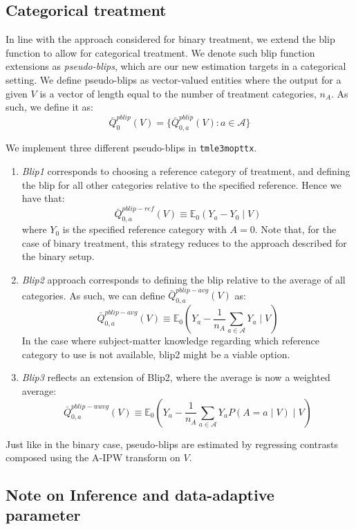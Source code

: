 \documentclass[12pt, krantz2,]{book}
\theoremstyle{definition}
\theoremstyle{definition}
\theoremstyle{definition}
\newcommand{\E}{\mathbb{E}}
\newcommand{\1}{\mathbbm{1}}
\begin{document}
\hypertarget{categorical-treatment}{%
\subsection{Categorical treatment}\label{categorical-treatment}}

In line with the approach considered for binary treatment, we extend the blip
function to allow for categorical treatment. We denote such blip function
extensions as \emph{pseudo-blips}, which are our new estimation targets in a
categorical setting. We define pseudo-blips as vector-valued entities where the
output for a given \(V\) is a vector of length equal to the number of treatment
categories, \(n_A\). As such, we define it as:
\[\bar{Q}_0^{pblip}(V) = \{\bar{Q}_{0,a}^{pblip}(V): a \in \mathcal{A} \}\]

We implement three different pseudo-blips in \texttt{tmle3mopttx}.

\begin{enumerate}
\def\labelenumi{\arabic{enumi}.}
\item
  \emph{Blip1} corresponds to choosing a reference category of treatment, and
  defining the blip for all other categories relative to the specified
  reference. Hence we have that:
  \[\bar{Q}_{0,a}^{pblip-ref}(V) \equiv \E_0(Y_a-Y_0 \mid V)\] where \(Y_0\) is
  the specified reference category with \(A=0\). Note that, for the case of
  binary treatment, this strategy reduces to the approach described for the
  binary setup.
\item
  \emph{Blip2} approach corresponds to defining the blip relative to the average of
  all categories. As such, we can define \(\bar{Q}_{0,a}^{pblip-avg}(V)\) as:
  \[\bar{Q}_{0,a}^{pblip-avg}(V) \equiv \E_0(Y_a - \frac{1}{n_A} \sum_{a \in
    \mathcal{A}} Y_a \mid V)\]
  In the case where subject-matter knowledge regarding which reference category
  to use is not available, blip2 might be a viable option.
\item
  \emph{Blip3} reflects an extension of Blip2, where the average is now a weighted
  average:
  \[\bar{Q}_{0,a}^{pblip-wavg}(V) \equiv \E_0(Y_a - \frac{1}{n_A} \sum_{a \in
    \mathcal{A}} Y_{a} P(A=a \mid V) \mid V)\]
\end{enumerate}

Just like in the binary case, pseudo-blips are estimated by regressing contrasts
composed using the A-IPW transform on \(V\).

\hypertarget{note-on-inference-and-data-adaptive-parameter}{%
\subsection{Note on Inference and data-adaptive parameter}\label{note-on-inference-and-data-adaptive-parameter}}
\end{document}
